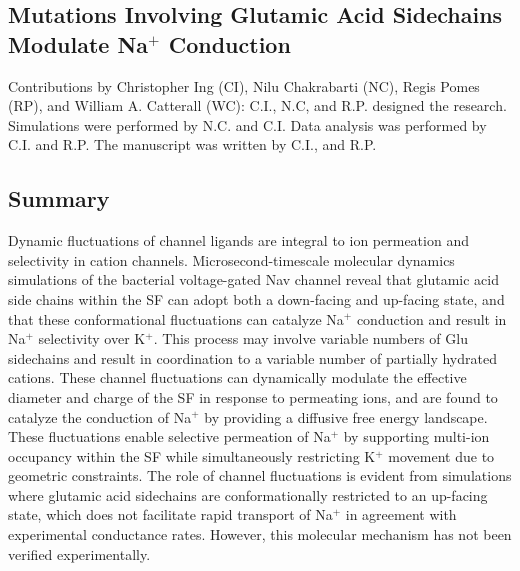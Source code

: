 \begin{refsection}
\chapter{Mutations Involving Glutamic Acid Sidechains Modulate Na$^+$ Conduction}

Contributions by Christopher Ing (CI), Nilu Chakrabarti (NC), Regis Pomes (RP), and William A. Catterall (WC): C.I., N.C, and R.P. designed the research. Simulations were performed by N.C. and C.I. Data analysis was performed by C.I. and R.P. The manuscript was written by C.I., and R.P. 

\newpage

\section{Summary}

	Dynamic fluctuations of channel ligands are integral to ion permeation and selectivity in cation channels. Microsecond-timescale molecular dynamics simulations of the bacterial voltage-gated Nav channel reveal that glutamic acid side chains within the SF can adopt both a down-facing and up-facing state, and that these conformational fluctuations can catalyze Na$^+$ conduction and result in Na$^+$ selectivity over K$^+$. This process may involve variable numbers of Glu sidechains and result in coordination to a variable number of partially hydrated cations. These channel fluctuations can dynamically modulate the effective diameter and charge of the SF in response to permeating ions, and are found to catalyze the conduction of Na$^+$ by providing a diffusive free energy landscape. These fluctuations enable selective permeation of Na$^+$ by supporting multi-ion occupancy within the SF while simultaneously restricting K$^+$ movement due to geometric constraints. The role of channel fluctuations is evident from simulations where glutamic acid sidechains are conformationally restricted to an up-facing state, which does not facilitate rapid transport of Na$^+$ in agreement with experimental conductance rates. However, this molecular mechanism has not been verified experimentally.
	

\end{refsection}
